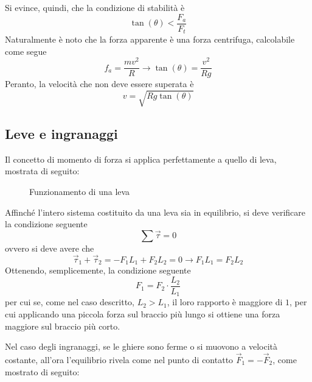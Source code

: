\documentclass[a4paper]{extarticle}
\begin{document}
\vspace{1em}
\noindent
Si evince, quindi, che la condizione di stabilità è
\[\tan(\theta) < \frac{F_a}{F_t}\]
Naturalmente è noto che la forza apparente è una forza centrifuga, calcolabile come segue
\[f_a=\frac{mv^2}{R} \longrightarrow \tan(\theta)=\frac{v^2}{Rg}\]
Peranto, la velocità che non deve essere superata è
\[\boxed{v=\sqrt{Rg\tan(\theta)}}\]

\vspace{1em}
\subsection{Leve e ingranaggi}
Il concetto di momento di forza si applica perfettamente a quello di leva, mostrata di seguito:

\begin{figure}[H]
  \centering

  \caption{Funzionamento di una leva}
  \label{fig:funzionamento_leva}
\end{figure}

\noindent
Affinché l'intero sistema costituito da una leva sia in equilibrio, si deve verificare la condizione seguente
\[\sum \vec \tau = 0\]
ovvero si deve avere che
\[\vec \tau_1 + \vec \tau_2 = -F_1 L_1 + F_2 L_2 = 0 \longrightarrow F_1 L_1 = F_2 L_2\]
Ottenendo, semplicemente, la condizione seguente
\[\boxed{F_1=F_2 \cdot \frac{L_2}{L_1}}\]
per cui se, come nel caso descritto, $L_2 > L_1$, il loro rapporto è maggiore di $1$, per cui applicando una piccola forza sul braccio più lungo si ottiene una forza maggiore sul braccio più corto.

\newpage
\noindent
Nel caso degli ingranaggi, se le ghiere sono ferme o si muovono a velocità costante, all'ora l'equilibrio rivela come nel punto di contatto $\vec F_1 = - \vec F_2$, come mostrato di seguito:
\end{document}
